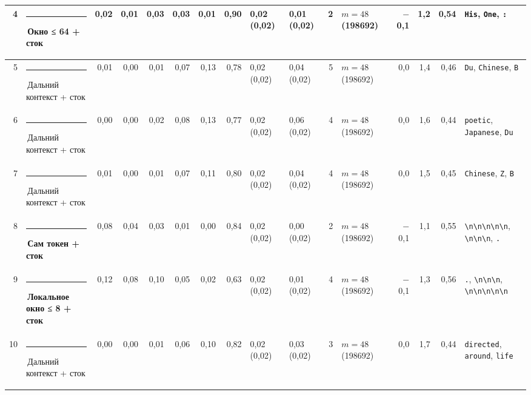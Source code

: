 \documentclass[10pt]{article}
\begin{document}
\begin{minipage}{\linewidth}
\begin{center}
{\begin{tabular}{|r|l|r|r|r|r|r|r|l|l|r|l|r|r|r|l|}
4 & \textcolor[HTML]{EDA100}{\rule{0.62em}{0.62em}}\,\textbf{Окно ≤ 64 + сток} & 0,02 & 0,01 & 0,03 & 0,03 & 0,01 & 0,90 & 0,02 (0,02) & 0,01 (0,02) & 2 & $m{=}48$ (198692) & $-$0,1 & 1,2 & 0,54 & \texttt{\textvisiblespace{}His}, \texttt{\textvisiblespace{}One}, \texttt{\textvisiblespace{}:} \\ \hline
5 & \textcolor[HTML]{C3C2B7}{\rule{0.62em}{0.62em}}\,Дальний контекст + сток & 0,01 & 0,00 & 0,01 & 0,07 & 0,13 & 0,78 & 0,02 (0,02) & 0,04 (0,02) & 5 & $m{=}48$ (198692) & 0,0 & 1,4 & 0,46 & \texttt{\textvisiblespace{}Du}, \texttt{\textvisiblespace{}Chinese}, \texttt{\textvisiblespace{}B} \\ \hline
6 & \textcolor[HTML]{C3C2B7}{\rule{0.62em}{0.62em}}\,Дальний контекст + сток & 0,00 & 0,00 & 0,02 & 0,08 & 0,13 & 0,77 & 0,02 (0,02) & 0,06 (0,02) & 4 & $m{=}48$ (198692) & 0,0 & 1,6 & 0,44 & \texttt{\textvisiblespace{}poetic}, \texttt{\textvisiblespace{}Japanese}, \texttt{\textvisiblespace{}Du} \\ \hline
7 & \textcolor[HTML]{C3C2B7}{\rule{0.62em}{0.62em}}\,Дальний контекст + сток & 0,01 & 0,00 & 0,01 & 0,07 & 0,11 & 0,80 & 0,02 (0,02) & 0,04 (0,02) & 4 & $m{=}48$ (198692) & 0,0 & 1,5 & 0,45 & \texttt{\textvisiblespace{}Chinese}, \texttt{\textvisiblespace{}Z}, \texttt{\textvisiblespace{}B} \\ \hline
8 & \textcolor[HTML]{2A78D6}{\rule{0.62em}{0.62em}}\,\textbf{Сам токен + сток} & 0,08 & 0,04 & 0,03 & 0,01 & 0,00 & 0,84 & 0,02 (0,02) & 0,00 (0,02) & 2 & $m{=}48$ (198692) & $-$0,1 & 1,1 & 0,55 & \texttt{\textvisiblespace{}\textbackslash{}n\textbackslash{}n\textbackslash{}n\textbackslash{}n\textbackslash{}n}, \texttt{\textvisiblespace{}\textbackslash{}n\textbackslash{}n\textbackslash{}n}, \texttt{\textvisiblespace{}.} \\ \hline
9 & \textcolor[HTML]{1BAF7A}{\rule{0.62em}{0.62em}}\,\textbf{Локальное окно ≤ 8 + сток} & 0,12 & 0,08 & 0,10 & 0,05 & 0,02 & 0,63 & 0,02 (0,02) & 0,01 (0,02) & 4 & $m{=}48$ (198692) & $-$0,1 & 1,3 & 0,56 & \texttt{\textvisiblespace{}.}, \texttt{\textvisiblespace{}\textbackslash{}n\textbackslash{}n\textbackslash{}n}, \texttt{\textvisiblespace{}\textbackslash{}n\textbackslash{}n\textbackslash{}n\textbackslash{}n\textbackslash{}n} \\ \hline
10 & \textcolor[HTML]{C3C2B7}{\rule{0.62em}{0.62em}}\,Дальний контекст + сток & 0,00 & 0,00 & 0,01 & 0,06 & 0,10 & 0,82 & 0,02 (0,02) & 0,03 (0,02) & 3 & $m{=}48$ (198692) & 0,0 & 1,7 & 0,44 & \texttt{\textvisiblespace{}directed}, \texttt{\textvisiblespace{}around}, \texttt{\textvisiblespace{}life} \\ \hline

\end{tabular}}
\end{center}
\end{minipage}
\end{document}
